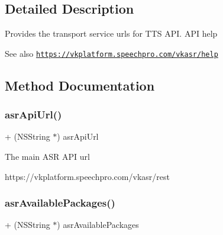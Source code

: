 \subsection{Detailed Description}
Provides the transport service urls for T\+TS A\+PI. A\+PI help \begin{DoxySeeAlso}{See also}
\href{https://vkplatform.speechpro.com/vkasr/help}{\tt https\+://vkplatform.\+speechpro.\+com/vkasr/help} 
\end{DoxySeeAlso}


\subsection{Method Documentation}
\hypertarget{interface_s_t_c_a_s_r_u_r_l_manager_a2954022e950e16a4929952965fa43ec1}{}\label{interface_s_t_c_a_s_r_u_r_l_manager_a2954022e950e16a4929952965fa43ec1} 
\subsubsection{\texorpdfstring{asr\+Api\+Url()}{asrApiUrl()}}
{\footnotesize\ttfamily + (N\+S\+String $\ast$) asr\+Api\+Url \begin{DoxyParamCaption}{ }\end{DoxyParamCaption}}

The main A\+SR A\+PI url 
\begin{DoxyCode}
https:\textcolor{comment}{//vkplatform.speechpro.com/vkasr/rest}
\end{DoxyCode}
 \hypertarget{interface_s_t_c_a_s_r_u_r_l_manager_a69b77a4c280941f683efeda91822010f}{}\label{interface_s_t_c_a_s_r_u_r_l_manager_a69b77a4c280941f683efeda91822010f} 
\subsubsection{\texorpdfstring{asr\+Available\+Packages()}{asrAvailablePackages()}}
{\footnotesize\ttfamily + (N\+S\+String $\ast$) asr\+Available\+Packages \begin{DoxyParamCaption}{ }\end{DoxyParamCaption}}

